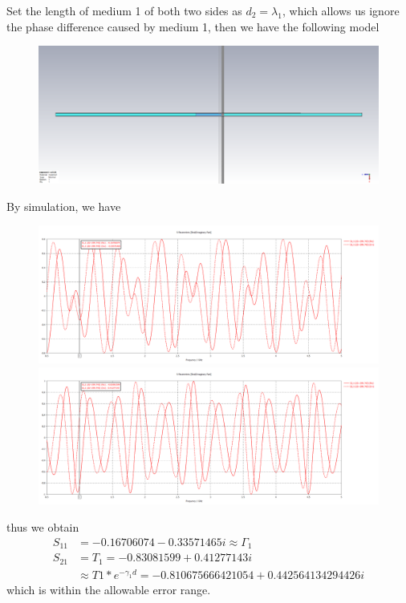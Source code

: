 \documentclass{article}
\begin{document}
Set the length of medium 1 of both two sides as $d_2 = \lambda_1$, which allows us ignore the phase difference caused by medium 1,
then we have the following model\\
\begin{figure}[h]
    \includegraphics[width=1\textwidth]{1.png}
\end{figure}

\pagebreak
By simulation, we have
\begin{figure}[h]
    \includegraphics[width=1\textwidth]{2.png}
    \includegraphics[width=1\textwidth]{3.png}
\end{figure}
thus we obtain
\begin{align*}
    S_{11} & = -0.16706074-0.33571465i \approx \Gamma_1\\
    S_{21} &= T_1 = -0.83081599+0.41277143i\\
    &\approx T1*e^{-\gamma_1d} = -0.810675666421054 + 0.442564134294426i
\end{align*}
which is within the allowable error range.
\end{document}
